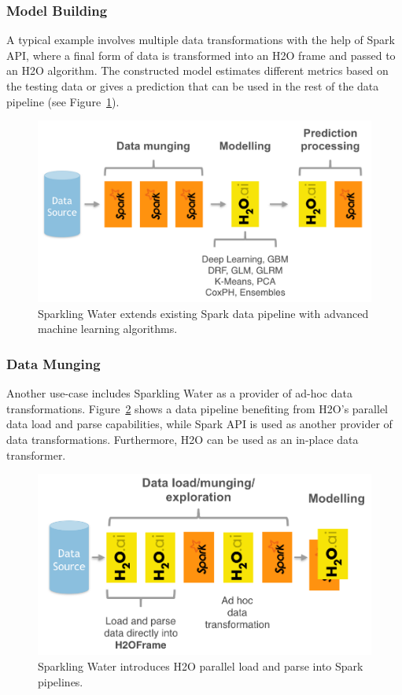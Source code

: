 \documentclass{standalone}
\begin{document}
    \subsubsection{Model Building}
    A typical example involves multiple data transformations with the help of Spark API, where a final form of data is
    transformed into an H2O frame and passed to an H2O algorithm. The constructed model estimates different metrics based
    on the testing data or gives a prediction that can be used in the rest of the data pipeline (see Figure~\ref{fig:use-case-1}).
    \begin{figure}[h!]
        \centering
        \includegraphics[scale=0.3]{../images/use-case-1.png}
        \caption{Sparkling Water extends existing Spark data pipeline with advanced machine learning algorithms.}
        \label{fig:use-case-1}
    \end{figure}

    \subsubsection{Data Munging}
    Another use-case includes Sparkling Water as a provider of ad-hoc data transformations. Figure~\ref{fig:use-case-2} shows
    a data pipeline benefiting from H2O's parallel data load and parse capabilities, while Spark API is used as another
    provider of data transformations. Furthermore, H2O can be used as an in-place data transformer.

    \begin{figure}[h!]
        \centering
        \includegraphics[scale=0.3]{../images/use-case-2.png}
        \caption{Sparkling Water introduces H2O parallel load and parse into Spark pipelines.}
        \label{fig:use-case-2}
    \end{figure}
\end{document}
